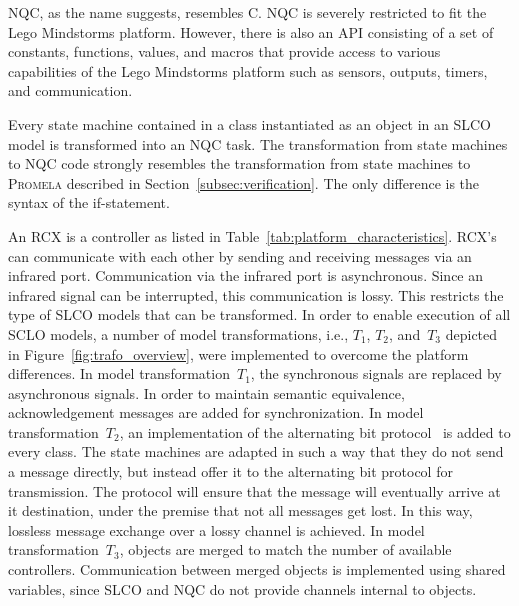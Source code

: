 NQC, as the name suggests, resembles \textsf{C}.
NQC is severely restricted to fit the Lego Mindstorms platform.
However, there is also an API consisting of a set of constants, functions, values, and macros that provide access to various capabilities of the Lego Mindstorms platform such as sensors, outputs, timers, and communication.

Every state machine contained in a class instantiated as an object in an SLCO model is transformed into an NQC task.
The transformation from state machines to NQC code strongly resembles the transformation from state machines to \textsc{Promela} described in Section~\ref{subsec:verification}.
The only difference is the syntax of the if-statement.

An RCX is a controller as listed in Table~\ref{tab:platform_characteristics}.
RCX's can communicate with each other by sending and receiving messages via an infrared port.
Communication via the infrared port is asynchronous.
Since an infrared signal can be interrupted, this communication is lossy.
This restricts the type of SLCO models that can be transformed.
In order to enable execution of all SCLO models, a number of model transformations, i.e., $T_1$, $T_2$, and~$T_3$ depicted in Figure~\ref{fig:trafo_overview}, were implemented to overcome the platform differences.
In model transformation~$T_1$, the synchronous signals are replaced by asynchronous signals.
In order to maintain semantic equivalence, acknowledgement messages are added for synchronization.
In model transformation~$T_2$, an implementation of the alternating bit protocol~\cite{Bartlett1969} is added to every class.
The state machines are adapted in such a way that they do not send a message directly, but instead offer it to the alternating bit protocol for transmission.
The protocol will ensure that the message will eventually arrive at it destination, under the premise that not all messages get lost.
In this way, lossless message exchange over a lossy channel is achieved.
In model transformation~$T_3$, objects are merged to match the number of available controllers.
Communication between merged objects is implemented using shared variables, since SLCO and NQC do not provide channels internal to objects. 